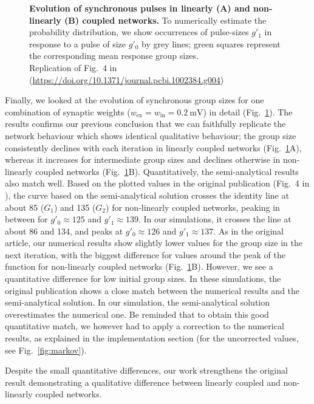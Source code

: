 \documentclass[10pt,a4paper,onecolumn]{article}
\begin{document}
\begin{figure}
\begin{subfigure}[t]{0.5\textwidth}
\end{subfigure}
\caption{\label{fig:markov_corrected}
\textbf{Evolution of synchronous pulses in linearly (A) and non-linearly (B) coupled networks.} To numerically estimate the probability distribution, we show occurrences of pulse-sizes $g'_1$ in response to a pulse of size $g'_0$ by grey lines; green squares represent the corresponding mean response group sizes.\\
Replication of Fig.~4 in \cite{Memmesheimer2012} (\url{https://doi.org/10.1371/journal.pcbi.1002384.g004})}
\end{figure}

Finally, we looked at the evolution of synchronous group sizes for one combination of synaptic weights ($w_\text{ex}=w_\text{in}=\SI{0.2}{\milli\volt}$) in detail (Fig.~\ref{fig:markov_corrected}). The results confirms our previous conclusion that we can faithfully replicate the network behaviour which shows identical qualitative behaviour; the group size consistently declines with each iteration in linearly coupled networks (Fig.~\ref{fig:markov_corrected}A), whereas it increases for intermediate group sizes and declines otherwise in non-linearly coupled networks (Fig.~\ref{fig:markov_corrected}B). Quantitatively, the semi-analytical results also match well. Based on the plotted values in the original publication (Fig.~4 in \cite{Memmesheimer2012}), the curve based on the semi-analytical solution crosses the identity line at about 85 ($G_1$) and 135 ($G_2$) for non-linearly coupled networks, peaking in between for $g'_0\approx125$ and $g'_1\approx139$. In our simulations, it crosses the line at about 86 and 134, and peaks at $g'_0\approx126$ and $g'_1\approx137$. As in the original article, our numerical results show slightly lower values for the group size in the next iteration, with the biggest difference for values around the peak of the function for non-linearly coupled networks (Fig.~\ref{fig:markov_corrected}B). However, we see a quantitative difference for low initial group sizes. In these simulations, the original publication shows a close match between the numerical results and the semi-analytical solution. In our simulation, the semi-analytical solution overestimates the numerical one.
Be reminded that to obtain this good quantitative match, we however had to apply a correction to the numerical results, as explained in the implementation section (for the uncorrected values, see Fig.~\ref{fig:markov}).

Despite the small quantitative differences, our work strengthens the original result demonstrating a qualitative difference between linearly coupled and non-linearly coupled networks.
\end{document}
